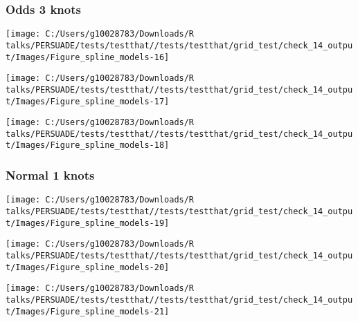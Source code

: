 \documentclass[
]{article}
\begin{document}
\clearpage

\subsubsection{Odds 3 knots}\label{odds-3-knots}

\begin{flushleft}\texttt{[image: C:/Users/g10028783/Downloads/R talks/PERSUADE/tests/testthat//tests/testthat/grid\_test/check\_14\_output/Images/Figure\_spline\_models-16]} \end{flushleft}

\begin{flushleft}\texttt{[image: C:/Users/g10028783/Downloads/R talks/PERSUADE/tests/testthat//tests/testthat/grid\_test/check\_14\_output/Images/Figure\_spline\_models-17]} \end{flushleft}

\begin{flushleft}\texttt{[image: C:/Users/g10028783/Downloads/R talks/PERSUADE/tests/testthat//tests/testthat/grid\_test/check\_14\_output/Images/Figure\_spline\_models-18]} \end{flushleft}

\clearpage

\subsubsection{Normal 1 knots}\label{normal-1-knots}

\begin{flushleft}\texttt{[image: C:/Users/g10028783/Downloads/R talks/PERSUADE/tests/testthat//tests/testthat/grid\_test/check\_14\_output/Images/Figure\_spline\_models-19]} \end{flushleft}

\begin{flushleft}\texttt{[image: C:/Users/g10028783/Downloads/R talks/PERSUADE/tests/testthat//tests/testthat/grid\_test/check\_14\_output/Images/Figure\_spline\_models-20]} \end{flushleft}

\begin{flushleft}\texttt{[image: C:/Users/g10028783/Downloads/R talks/PERSUADE/tests/testthat//tests/testthat/grid\_test/check\_14\_output/Images/Figure\_spline\_models-21]} \end{flushleft}

\clearpage
\end{document}
